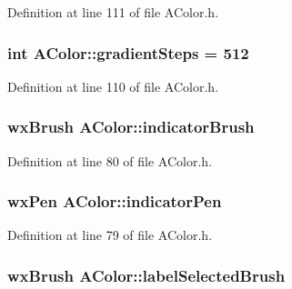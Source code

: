 Definition at line 111 of file A\+Color.\+h.

\subsubsection[{\texorpdfstring{gradient\+Steps}{gradientSteps}}]{ {\bf int} A\+Color\+::gradient\+Steps = 512\hspace{0.3cm}{\ttfamily [static]}}\hypertarget{class_a_color_a8798d17ce9eaaf61a9d91525f0fa632c}{}\label{class_a_color_a8798d17ce9eaaf61a9d91525f0fa632c}


Definition at line 110 of file A\+Color.\+h.

\subsubsection[{\texorpdfstring{indicator\+Brush}{indicatorBrush}}]{\setlength{\rightskip}{0pt plus 5cm}wx\+Brush A\+Color\+::indicator\+Brush\hspace{0.3cm}{\ttfamily [static]}}\hypertarget{class_a_color_a9e0d1b98d6c3265704e745e89246b73f}{}\label{class_a_color_a9e0d1b98d6c3265704e745e89246b73f}


Definition at line 80 of file A\+Color.\+h.

\subsubsection[{\texorpdfstring{indicator\+Pen}{indicatorPen}}]{\setlength{\rightskip}{0pt plus 5cm}wx\+Pen A\+Color\+::indicator\+Pen\hspace{0.3cm}{\ttfamily [static]}}\hypertarget{class_a_color_ac17b92375412469dccbcfae2fb0e5d43}{}\label{class_a_color_ac17b92375412469dccbcfae2fb0e5d43}


Definition at line 79 of file A\+Color.\+h.

\subsubsection[{\texorpdfstring{label\+Selected\+Brush}{labelSelectedBrush}}]{\setlength{\rightskip}{0pt plus 5cm}wx\+Brush A\+Color\+::label\+Selected\+Brush\hspace{0.3cm}{\ttfamily [static]}}\hypertarget{class_a_color_a08240cbb4322e9f5725e865033c1f37a}{}\label{class_a_color_a08240cbb4322e9f5725e865033c1f37a}


